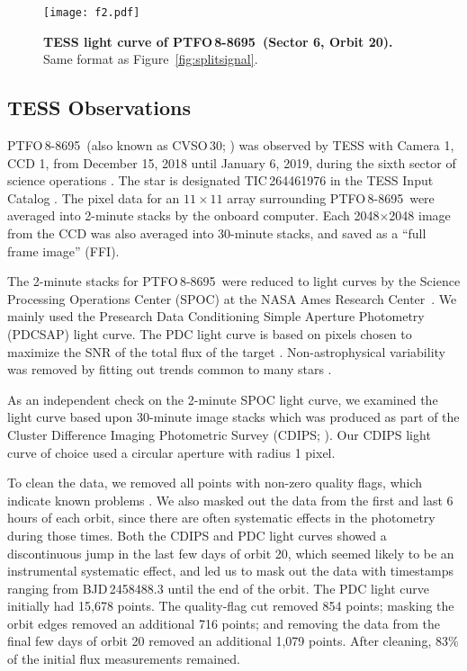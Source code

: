 \documentclass[12pt,twocolumn,tighten]{aastex62}
\newcommand{\ptfo}{PTFO$\,$8-8695}
\begin{document}
\begin{figure}[hbtp]
	\begin{center}
		\leavevmode
		\texttt{[image: f2.pdf]}
	\end{center}
	\vspace{-0.7cm}
  \caption{ {\bf TESS light curve of \ptfo\ (Sector 6, Orbit 20).}
  Same format as Figure~\ref{fig:splitsignal}.
  \label{fig:splitsignalii}
	}
\end{figure}

\subsection{TESS Observations}

\ptfo\ (also known as CVSO\,30; \citealt{briceno_cida_2005}) was
observed by TESS with Camera 1, CCD 1, from December 15, 2018 until
January 6, 2019, during the sixth sector of science operations
\citep{ricker_transiting_2015}.  The star is designated TIC\,264461976
in the TESS Input Catalog \citep{stassun_TIC_2018,stassun_TIC8_2019}.
The pixel data for an $11\times11$ array surrounding \ptfo\ were
averaged into 2-minute stacks by the onboard computer.  Each
2048$\times$2048 image from the CCD was also averaged into 30-minute
stacks, and saved as a ``full frame image'' (FFI).

The 2-minute stacks for \ptfo\ were reduced to light curves by the
Science Processing Operations Center (SPOC) at the NASA Ames Research
Center~\citep{jenkins_tess_2016}.  We mainly used the Presearch Data
Conditioning Simple Aperture Photometry (PDCSAP) light curve.  The PDC
light curve is based on pixels chosen to maximize the SNR of the total
flux of the target \citep{bryson_2020_target_aperture}.
Non-astrophysical variability was removed by fitting out trends common
to many stars \citep{smith_kepler_2012,stumpe_multiscale_2014}.

As an independent check on the 2-minute SPOC light curve, we examined
the light curve based upon 30-minute image stacks which was produced
as part of the Cluster Difference Imaging Photometric Survey (CDIPS;
\citealt{bouma_cluster_2019}).  Our CDIPS light curve of choice used a
circular aperture with radius 1 pixel.

To clean the data, we removed all points with non-zero quality flags,
which indicate known problems \citep[{\it
e.g.},][]{tess_data_product_description_2018}.  We also masked out the
data from the first and last 6 hours of each orbit, since there are
often systematic effects in the photometry during those times.  Both
the CDIPS and PDC light curves showed a discontinuous jump in the last
few days of orbit 20, which seemed likely to be an instrumental
systematic effect, and led us to mask out the data with timestamps
ranging from BJD\,2458488.3 until the end of the orbit.  The PDC light
curve initially had 15{,}678 points.  The quality-flag cut removed 854
points; masking the orbit edges removed an additional 716 points; and
removing the data from the final few days of orbit 20 removed an
additional 1{,}079 points.  After cleaning, 83\% of the initial flux
measurements remained.
\end{document}
